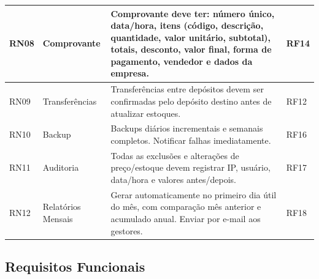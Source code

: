 \documentclass[
	12pt,				%
	openright,			%
	twoside,			%
	a4paper,			%
	english,			%
	french,				%
	spanish,			%
	brazil				%
	]{abntex2}
\begin{document}
\begin{quadro}[htb]
\begin{tabular}{|p{1.2cm}|p{4.0cm}|p{7.5cm}|p{2.0cm}|}
    RN08 & Comprovante & Comprovante deve ter: número único, data/hora, itens (código, descrição, quantidade, valor unitário, subtotal), totais, desconto, valor final, forma de pagamento, vendedor e dados da empresa. & RF14 \\ \hline

    RN09 & Transferências & Transferências entre depósitos devem ser confirmadas pelo depósito destino antes de atualizar estoques. & RF12 \\ \hline

    RN10 & Backup & Backups diários incrementais e semanais completos. Notificar falhas imediatamente. & RF16 \\ \hline

    RN11 & Auditoria & Todas as exclusões e alterações de preço/estoque devem registrar IP, usuário, data/hora e valores antes/depois. & RF17 \\ \hline

    RN12 & Relatórios Mensais & Gerar automaticamente no primeiro dia útil do mês, com comparação mês anterior e acumulado anual. Enviar por e-mail aos gestores. & RF18 \\ \hline

\end{tabular}
\end{quadro}

\FloatBarrier




\subsection{Requisitos Funcionais}
\end{document}
